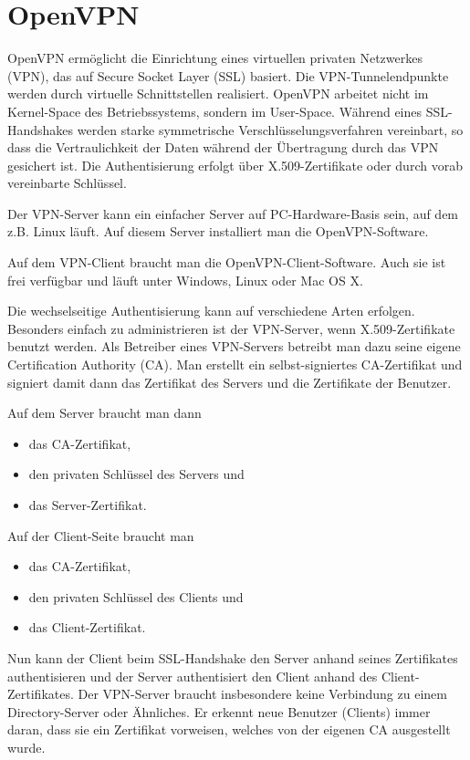 \section{OpenVPN}
\label{sec:openvpn}

OpenVPN ermöglicht die Einrichtung eines virtuellen privaten Netzwerkes (VPN),
das auf Secure Socket Layer (SSL) basiert. Die VPN-Tunnelendpunkte werden durch
virtuelle Schnittstellen realisiert. OpenVPN arbeitet nicht im Kernel-Space des
Betriebssystems, sondern im User-Space. Während eines SSL\hyp Handshakes werden
starke symmetrische Verschlüsselungsverfahren vereinbart, so dass die
Vertraulichkeit der Daten während der Übertragung durch das VPN gesichert
ist. Die Authentisierung erfolgt über X.509-Zertifikate oder durch vorab
vereinbarte Schlüssel.

Der VPN-Server kann ein einfacher Server auf PC-Hardware-Basis sein, auf dem
z.B. Linux läuft. Auf diesem Server installiert man die OpenVPN-Software.

Auf dem VPN-Client braucht man die OpenVPN-Client-Software. Auch sie ist frei
verfügbar und läuft unter Windows, Linux oder Mac OS X.

Die wechselseitige Authentisierung kann auf verschiedene Arten
erfolgen. Besonders einfach zu administrieren ist der VPN-Server, wenn
X.509-Zertifikate benutzt werden. Als Betreiber eines VPN-Servers betreibt man
dazu seine eigene Certification Authority (CA). Man erstellt ein
selbst-signiertes CA-Zertifikat und signiert damit dann das Zertifikat des
Servers und die Zertifikate der Benutzer.

Auf dem Server braucht man dann

\begin{itemize}
  \item das CA-Zertifikat,
  \item den privaten Schlüssel des Servers und
  \item das Server-Zertifikat.
\end{itemize}

Auf der Client-Seite braucht man

\begin{itemize}
  \item das CA-Zertifikat,
  \item den privaten Schlüssel des Clients und
  \item das Client-Zertifikat.
\end{itemize}

Nun kann der Client beim SSL-Handshake den Server anhand seines Zertifikates
authentisieren und der Server authentisiert den Client anhand des
Client-Zertifikates. Der VPN-Server braucht insbesondere keine Verbindung zu
einem Directory-Server oder Ähnliches. Er erkennt neue Benutzer (Clients) immer
daran, dass sie ein Zertifikat vorweisen, welches von der eigenen CA ausgestellt
wurde.


